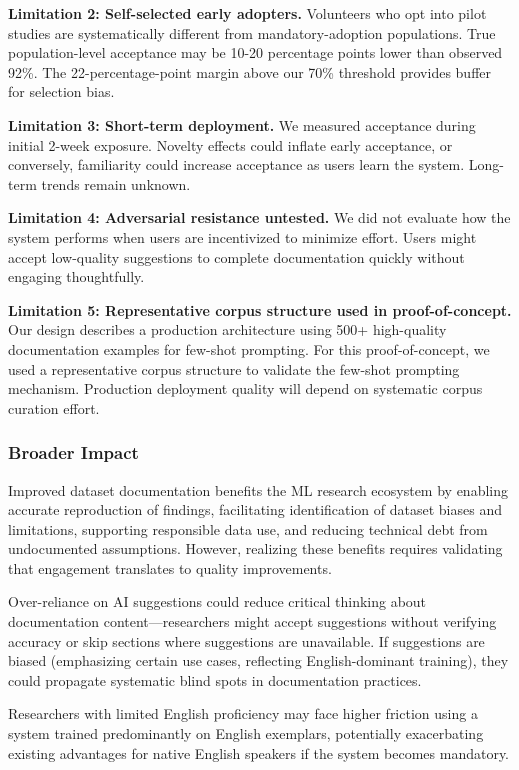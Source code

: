\textbf{Limitation 2: Self-selected early adopters.} Volunteers who opt into pilot studies are systematically different from mandatory-adoption populations. True population-level acceptance may be 10-20 percentage points lower than observed 92\%. The 22-percentage-point margin above our 70\% threshold provides buffer for selection bias.

\textbf{Limitation 3: Short-term deployment.} We measured acceptance during initial 2-week exposure. Novelty effects could inflate early acceptance, or conversely, familiarity could increase acceptance as users learn the system. Long-term trends remain unknown.

\textbf{Limitation 4: Adversarial resistance untested.} We did not evaluate how the system performs when users are incentivized to minimize effort. Users might accept low-quality suggestions to complete documentation quickly without engaging thoughtfully.

\textbf{Limitation 5: Representative corpus structure used in proof-of-concept.} Our design describes a production architecture using 500+ high-quality documentation examples for few-shot prompting. For this proof-of-concept, we used a representative corpus structure to validate the few-shot prompting mechanism. Production deployment quality will depend on systematic corpus curation effort.

\subsubsection{Broader Impact}

Improved dataset documentation benefits the ML research ecosystem by enabling accurate reproduction of findings, facilitating identification of dataset biases and limitations, supporting responsible data use, and reducing technical debt from undocumented assumptions. However, realizing these benefits requires validating that engagement translates to quality improvements.

Over-reliance on AI suggestions could reduce critical thinking about documentation content—researchers might accept suggestions without verifying accuracy or skip sections where suggestions are unavailable. If suggestions are biased (emphasizing certain use cases, reflecting English-dominant training), they could propagate systematic blind spots in documentation practices.

Researchers with limited English proficiency may face higher friction using a system trained predominantly on English exemplars, potentially exacerbating existing advantages for native English speakers if the system becomes mandatory.
